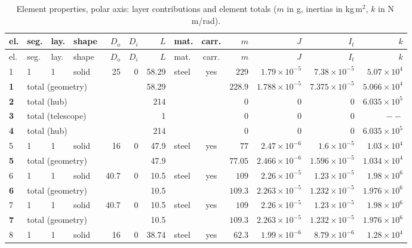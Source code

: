 \documentclass[10pt,a4paper]{article}
\numberwithin{equation}{section}
\begin{document}
\begin{longtable}{llllrrrlcrrrr}
\caption{Element properties, polar axis: layer contributions and element totals ($m$ in g, inertias in kg\,m$^2$, $k$ in N\,m/rad).}\\
\toprule
el. & seg. & lay. & shape & $D_o$ & $D_i$ & $L$ & mat. & carr. & $m$ & $J$ & $I_t$ & $k$ \\
\midrule\endfirsthead
\toprule el. & seg. & lay. & shape & $D_o$ & $D_i$ & $L$ & mat. & carr. & $m$ & $J$ & $I_t$ & $k$ \\ \midrule\endhead
1 & 1 & 1 & solid & 25 & 0 & 58.29 & steel & yes & $229$ & $1.79\times10^{-5}$ & $7.38\times10^{-5}$ & $5.07\times10^{4}$ \\
\midrule \textbf{1} & \multicolumn{5}{l}{total (geometry)} & 58.29 & & & $228.9$ & $1.788\times10^{-5}$ & $7.375\times10^{-5}$ & $5.066\times10^{4}$ \\ \midrule
\midrule \textbf{2} & \multicolumn{5}{l}{total (hub)} & 214 & & & $0$ & $0$ & $0$ & $6.035\times10^{5}$ \\ \midrule
\midrule \textbf{3} & \multicolumn{5}{l}{total (telescope)} & 1 & & & $0$ & $0$ & $0$ & $--$ \\ \midrule
\midrule \textbf{4} & \multicolumn{5}{l}{total (hub)} & 214 & & & $0$ & $0$ & $0$ & $6.035\times10^{5}$ \\ \midrule
5 & 1 & 1 & solid & 16 & 0 & 47.9 & steel & yes & $77$ & $2.47\times10^{-6}$ & $1.6\times10^{-5}$ & $1.03\times10^{4}$ \\
\midrule \textbf{5} & \multicolumn{5}{l}{total (geometry)} & 47.9 & & & $77.05$ & $2.466\times10^{-6}$ & $1.596\times10^{-5}$ & $1.034\times10^{4}$ \\ \midrule
6 & 1 & 1 & solid & 40.7 & 0 & 10.5 & steel & yes & $109$ & $2.26\times10^{-5}$ & $1.23\times10^{-5}$ & $1.98\times10^{6}$ \\
\midrule \textbf{6} & \multicolumn{5}{l}{total (geometry)} & 10.5 & & & $109.3$ & $2.263\times10^{-5}$ & $1.232\times10^{-5}$ & $1.976\times10^{6}$ \\ \midrule
7 & 1 & 1 & solid & 40.7 & 0 & 10.5 & steel & yes & $109$ & $2.26\times10^{-5}$ & $1.23\times10^{-5}$ & $1.98\times10^{6}$ \\
\midrule \textbf{7} & \multicolumn{5}{l}{total (geometry)} & 10.5 & & & $109.3$ & $2.263\times10^{-5}$ & $1.232\times10^{-5}$ & $1.976\times10^{6}$ \\ \midrule
8 & 1 & 1 & solid & 16 & 0 & 38.74 & steel & yes & $62.3$ & $1.99\times10^{-6}$ & $8.79\times10^{-6}$ & $1.28\times10^{4}$ \\

\end{longtable}
\end{document}
